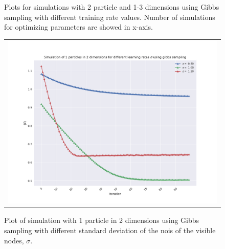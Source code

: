 \begin{figure}
\begin{tabular}{cc}
\end{tabular}
\caption{Plots for simulations with 2 particle and 1-3 dimensions using Gibbs sampling with different training rate values. Number of simulations for optimizing parameters are showed in x-axis.}
\label{fig:1f_2}
\end{figure}

\begin{figure}
\hspace{-2.8cm}
\begin{tabular}{c}
\includegraphics[width = 1.0\paperwidth]{figures/gibbs_08_1_12_gamma04.pdf}\\
\end{tabular}
\caption{Plot of simulation with 1 particle in 2 dimensions using Gibbs sampling with different standard deviation of the nois of the visible nodes, $\sigma$.}
\label{fig:1f_3}
\end{figure}
